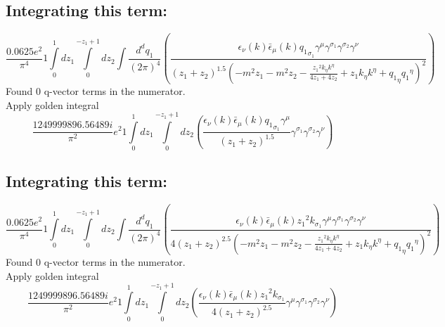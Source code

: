 \subsection*{Integrating this term:}
\begin{dmath}\frac{0.0625 e^{2}}{\pi^{4}}1\int\limits_{ 0 }^{ 1 } d{ z_{ 1 } }\int\limits_{ 0 }^{ - { z_{ 1 } } + 1 } d{ z_{ 2 } }\int\frac{d^d q_1 }{ (2\pi)^4 }\left(\frac{\epsilon_{ \nu }({ k }) \bar{\epsilon}_{ \mu }({ k }) { { q_1 }_{ \sigma_1 } } { \gamma^{ \mu } } { \gamma^{ \sigma_1 } } { \gamma^{ \sigma_2 } } { \gamma^{ \nu } }}{\left({ z_{ 1 } } + { z_{ 2 } }\right)^{1.5} \left(- m^{2} { z_{ 1 } } - m^{2} { z_{ 2 } } - \frac{{ z_{ 1 } }^{2} { { k }_{ \eta } } { { k }^{ \eta } }}{4 { z_{ 1 } } + 4 { z_{ 2 } }} + { z_{ 1 } } { { k }_{ \eta } } { { k }^{ \eta } } + { { q_1 }_{ \eta } } { { q_1 }^{ \eta } }\right)^{2}}\right)\end{dmath}
Found 0 q-vector terms in the numerator.\\
Apply golden integral
\begin{dmath}\frac{1249999896.56489 i}{\pi^{2}} e^{2}1\int\limits_{ 0 }^{ 1 } d{ z_{ 1 } }\int\limits_{ 0 }^{ - { z_{ 1 } } + 1 } d{ z_{ 2 } }\left(\frac{\epsilon_{ \nu }({ k }) \bar{\epsilon}_{ \mu }({ k }) { { q_1 }_{ \sigma_1 } } { \gamma^{ \mu } }}{\left({ z_{ 1 } } + { z_{ 2 } }\right)^{1.5}} { \gamma^{ \sigma_1 } } { \gamma^{ \sigma_2 } } { \gamma^{ \nu } }\right)\end{dmath}
\subsection*{Integrating this term:}
\begin{dmath}\frac{0.0625 e^{2}}{\pi^{4}}1\int\limits_{ 0 }^{ 1 } d{ z_{ 1 } }\int\limits_{ 0 }^{ - { z_{ 1 } } + 1 } d{ z_{ 2 } }\int\frac{d^d q_1 }{ (2\pi)^4 }\left(\frac{\epsilon_{ \nu }({ k }) \bar{\epsilon}_{ \mu }({ k }) { z_{ 1 } }^{2} { { k }_{ \sigma_1 } } { \gamma^{ \mu } } { \gamma^{ \sigma_1 } } { \gamma^{ \sigma_2 } } { \gamma^{ \nu } }}{4 \left({ z_{ 1 } } + { z_{ 2 } }\right)^{2.5} \left(- m^{2} { z_{ 1 } } - m^{2} { z_{ 2 } } - \frac{{ z_{ 1 } }^{2} { { k }_{ \eta } } { { k }^{ \eta } }}{4 { z_{ 1 } } + 4 { z_{ 2 } }} + { z_{ 1 } } { { k }_{ \eta } } { { k }^{ \eta } } + { { q_1 }_{ \eta } } { { q_1 }^{ \eta } }\right)^{2}}\right)\end{dmath}
Found 0 q-vector terms in the numerator.\\
Apply golden integral
\begin{dmath}\frac{1249999896.56489 i}{\pi^{2}} e^{2}1\int\limits_{ 0 }^{ 1 } d{ z_{ 1 } }\int\limits_{ 0 }^{ - { z_{ 1 } } + 1 } d{ z_{ 2 } }\left(\frac{\epsilon_{ \nu }({ k }) \bar{\epsilon}_{ \mu }({ k }) { z_{ 1 } }^{2} { { k }_{ \sigma_1 } }}{4 \left({ z_{ 1 } } + { z_{ 2 } }\right)^{2.5}} { \gamma^{ \mu } } { \gamma^{ \sigma_1 } } { \gamma^{ \sigma_2 } } { \gamma^{ \nu } }\right)\end{dmath}
